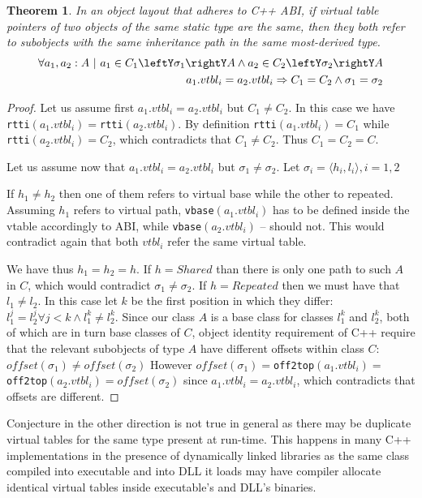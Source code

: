 \documentclass[preprint]{sigplanconf}
\makeatletter
\DeclareRobustCommand{\code}[1]{{\lstinline[breaklines=false,escapechar=@]{#1}}}
\newtheorem{theorem}{Theorem}
\makeatother
\begin{document}
\begin{theorem}
In an object layout that adheres to C++ ABI, if virtual table pointers of two 
objects of the same static type are the same, then they both refer to subobjects 
with the same inheritance path in the same most-derived type.
\begin{eqnarray*}
    \forall a_1, a_2 : A\ |\ a_1\in C_1\leftY\sigma_1\rightY A \wedge a_2\in C_2\leftY\sigma_2\rightY A \\
    a_1.vtbl_i = a_2.vtbl_i \Rightarrow C_1 = C_2 \wedge \sigma_1 = \sigma_2
\end{eqnarray*}
\label{thm:vtbl}
\end{theorem}
\begin{proof}
Let us assume first $a_1.vtbl_i = a_2.vtbl_i$ but $C_1 \neq C_2$. In this case we 
have \code{rtti}$(a_1.vtbl_i) = $\code{rtti}$(a_2.vtbl_i)$. By definition 
\code{rtti}$(a_1.vtbl_i) = C_1$ while \code{rtti}$(a_2.vtbl_i) = C_2$, which 
contradicts that $C_1 \neq C_2$. Thus $C_1 = C_2 = C$.

Let us assume now that $a_1.vtbl_i = a_2.vtbl_i$ but $\sigma_1 \neq \sigma_2$. 
Let $\sigma_i=\langle h_i,l_i\rangle,i=1,2$ 

If $h_1 \neq h_2$ then one of them refers to virtual base while the other to 
repeated. Assuming $h_1$ refers to virtual path, \code{vbase}$(a_1.vtbl_i)$ has 
to be defined inside the vtable accordingly to ABI, while 
\code{vbase}$(a_2.vtbl_i)$ -- should not. This would contradict again that both 
$vtbl_i$ refer the same virtual table.

We have thus $h_1 = h_2 = h$. If $h = Shared$ than there is only one path to 
such $A$ in $C$, which would contradict $\sigma_1 \neq \sigma_2$. 
If $h = Repeated$ then we must have that $l_1 \neq l_2$. In this case let $k$ be 
the first position in which they differ: 
$l_1^j=l_2^j \forall j<k \wedge l_1^k\neq l_2^k$. Since our class $A$ is a base 
class for classes $l_1^k$ and $l_2^k$, both of which are in turn base classes of 
$C$, object identity requirement of C++ require that the relevant subobjects of 
type $A$ have different offsets within class $C$: 
$offset(\sigma_1)\neq offset(\sigma_2)$ However 
$offset(\sigma_1)=$\code{off2top}$(a_1.vtbl_i)=$\code{off2top}$(a_2.vtbl_i)=offset(\sigma_2)$ 
since $a_1.vtbl_i = a_2.vtbl_i$, which contradicts that offsets are different.
\end{proof}

Conjecture in the other direction is not true in general as there may be 
duplicate virtual tables for the same type present at run-time. This happens in 
many C++ implementations in the presence of dynamically linked libraries as the
same class compiled into executable and into DLL it loads may have compiler 
allocate identical virtual tables inside executable's and DLL's binaries.
\end{document}

